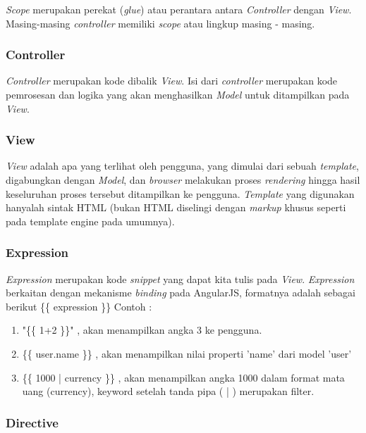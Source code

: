 	\textit{Scope} merupakan perekat (\textit{glue}) atau perantara antara \textit{Controller} dengan \textit{View}. Masing-masing \textit{controller} memiliki \textit{scope} atau lingkup masing - masing.
	
\subsubsection{Controller}
\label{subsub: controller}

	\textit{Controller} merupakan kode dibalik \textit{View}. Isi dari \textit{controller} merupakan kode pemrosesan dan logika yang akan menghasilkan \textit{Model} untuk ditampilkan pada \textit{View}.

\subsubsection{View}
\label{subsub: view}

	\textit{View} adalah apa yang terlihat oleh pengguna, yang dimulai dari sebuah \textit{template}, digabungkan dengan \textit{Model}, dan \textit{browser} melakukan proses \textit{rendering} hingga hasil keseluruhan proses tersebut ditampilkan ke pengguna. \textit{Template} yang digunakan hanyalah sintak HTML (bukan HTML diselingi dengan \textit{markup} khusus seperti pada template engine pada umumnya).

\subsubsection{Expression}
\label{subsub: expression}

	\textit{Expression} merupakan kode \textit{snippet} yang dapat kita tulis pada \textit{View}. \textit{Expression} berkaitan dengan mekanisme \textit{binding} pada AngularJS, formatnya adalah sebagai berikut \{\{ expression \}\} Contoh :
	
	\begin{enumerate}
		\item "\{\{ 1+2 \}\}" , akan menampilkan angka 3 ke pengguna.
		\item \{\{ user.name \}\} , akan menampilkan nilai properti 'name' dari model 'user'
		\item \{\{ 1000 | currency \}\} , akan menampilkan angka 1000 dalam format mata uang (currency), keyword setelah tanda pipa ( | ) merupakan filter.
	\end{enumerate}

\subsubsection{Directive}
\label{subsub: directive}

